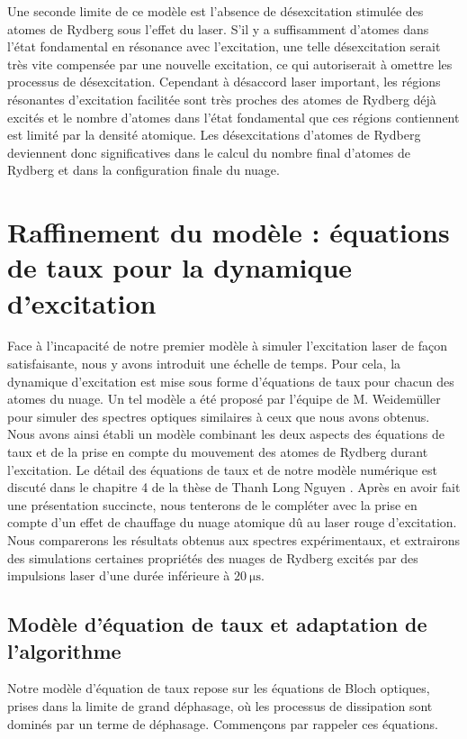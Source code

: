Une seconde limite de ce modèle est l'absence de désexcitation stimulée des atomes de Rydberg sous l'effet du laser.
S'il y a suffisamment d'atomes dans l'état fondamental en résonance avec l'excitation, une telle désexcitation serait très vite compensée par une nouvelle excitation, ce qui autoriserait à omettre les processus de désexcitation.
Cependant à désaccord laser important, les régions résonantes d'excitation facilitée sont très proches des atomes de Rydberg déjà excités et le nombre d'atomes dans l'état fondamental que ces régions contiennent est limité par la densité atomique.
Les désexcitations d'atomes de Rydberg deviennent donc significatives dans le calcul du nombre final d'atomes de Rydberg et dans la configuration finale du nuage.

\clearpage
\section{Raffinement du modèle : équations de taux pour la dynamique d'excitation}
\noindent Face à l'incapacité de notre premier modèle à simuler l'excitation laser de façon satisfaisante, nous y avons introduit une échelle de temps.
Pour cela, la dynamique d'excitation est mise sous forme d'équations de taux pour chacun des atomes du nuage.
Un tel modèle a été proposé par l'équipe de M. Weidemüller \cite{MX_WEIDEMULLERRYDAGREGATES14} pour simuler des spectres optiques similaires à ceux que nous avons obtenus.
Nous avons ainsi établi un modèle combinant les deux aspects des équations de taux et de la prise en compte du mouvement des atomes de Rydberg durant l'excitation.
Le détail des équations de taux et de notre modèle numérique est discuté dans le chapitre 4 de la thèse de Thanh Long Nguyen \cite{PHD_NGUYEN}.
Après en avoir fait une présentation succincte, nous tenterons de le compléter avec la prise en compte d'un effet de chauffage du nuage atomique dû au laser rouge d'excitation.
Nous comparerons les résultats obtenus aux spectres expérimentaux, et extrairons des simulations certaines propriétés des nuages de Rydberg excités par des impulsions laser d'une durée inférieure à $\SI{20}{\us}$.
	
	\subsection{Modèle d'équation de taux et adaptation de l'algorithme}\label{subsec:rate_equation}
\noindent Notre modèle d'équation de taux repose sur les équations de Bloch optiques, prises dans la limite de grand déphasage, où les processus de dissipation sont dominés par un terme de déphasage.
Commençons par rappeler ces équations.

